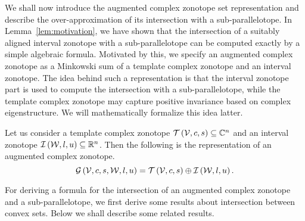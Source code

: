 We shall now introduce the augmented complex zonotope set
representation and describe the over-approximation of its intersection
with a sub-parallelotope.  In Lemma~\ref{lem:motivation}, we have shown that the
intersection of a suitably aligned interval zonotope with a
sub-parallelotope can be computed exactly by a simple algebraic
formula.  Motivated by this, we specify an augmented complex zonotope
as a Minkowski sum of a template complex zonotope and an interval
zonotope.  The idea behind such a representation is that the interval
zonotope part is used to compute the intersection with a
sub-parallelotope, while the template complex zonotope may capture
positive invariance based on complex eigenstructure.  We will
mathematically formalize this idea latter.
%
\begin{definition}
Let us consider a template complex zonotope
$\mathit{\operatorname{\mathcal{T}}}\left(\mathcal{V},c,s\right)\subseteq\mathbb{C}^n$ and an interval
zonotope $\mathit{\operatorname{\mathcal{I}}}\left(\mathcal{W},l,u\right)\subseteq\mathbb{R}^n$.  Then the
following is the representation of an augmented complex zonotope.
%
\[
\mathcal{G}\left(\mathcal{V},c,s,\mathcal{W},l,u\right)=\mathit{\operatorname{\mathcal{T}}}\left(\mathcal{V},c,s\right)\oplus \mathit{\operatorname{\mathcal{I}}}\left(\mathcal{W},l,u\right).
\]
%
\end{definition}
%
For deriving a formula for the intersection of an augmented complex
zonotope and a sub-parallelotope, we first derive some results about
intersection between convex sets.  Below we shall describe some
related results.

